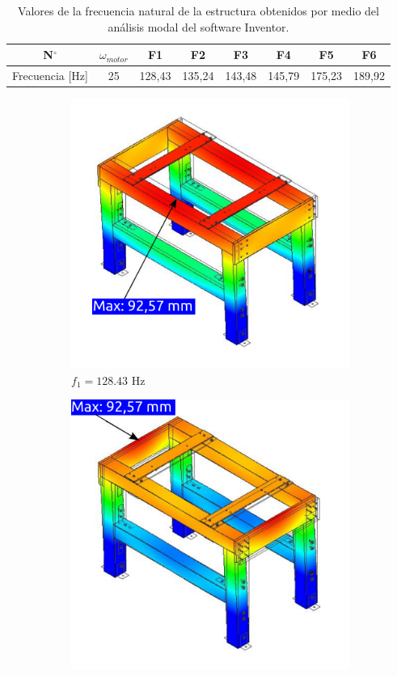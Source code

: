 \begin{table}[h]
\centering
\begin{tabular}{@{}cccccccc@{}}
\toprule
N$^{\circ}$ &  $\omega_{motor}$ & F1 & F2 & F3 & F4 & F5 & F6  \\ \midrule
Frecuencia [Hz] & 25 & 128,43 & 135,24 & 143,48 & 145,79 & 175,23 & 189,92 \\ \bottomrule
\end{tabular} 
\caption{Valores de la frecuencia natural de la estructura obtenidos por medio del análisis modal del software Inventor. }
\label{tab:frec_nat}
\end{table}

\begin{figure}[]
\centering
	\begin{subfigure}{0.5\linewidth}
		\centering
		\includegraphics[width=0.9\linewidth]{Imagenes/F1.pdf}
		\caption{$f_1 = 128.43$ Hz}\label{fig:frecuencia_1}
	\end{subfigure}%
	\begin{subfigure}{0.5\linewidth}
		\centering
		\includegraphics[width=0.9\linewidth]{Imagenes/F2.pdf}

\end{subfigure}
\end{figure}
